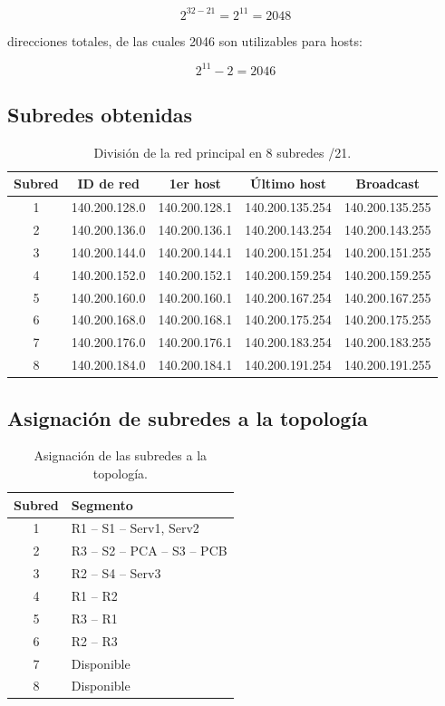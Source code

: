 \documentclass[12pt]{article}
\begin{document}
\[
2^{32-21}=2^{11}=2048
\]

direcciones totales, de las cuales 2046 son utilizables para hosts:

\[
2^{11}-2=2046
\]

\subsection{Subredes obtenidas}

\begin{table}[h]
\centering
\begin{tabular}{c|c|c|c|c}
\textbf{Subred} & \textbf{ID de red} & \textbf{1er host} &
\textbf{Último host} & \textbf{Broadcast}\\
\hline
1 & 140.200.128.0 & 140.200.128.1 & 140.200.135.254 & 140.200.135.255\\
2 & 140.200.136.0 & 140.200.136.1 & 140.200.143.254 & 140.200.143.255\\
3 & 140.200.144.0 & 140.200.144.1 & 140.200.151.254 & 140.200.151.255\\
4 & 140.200.152.0 & 140.200.152.1 & 140.200.159.254 & 140.200.159.255\\
5 & 140.200.160.0 & 140.200.160.1 & 140.200.167.254 & 140.200.167.255\\
6 & 140.200.168.0 & 140.200.168.1 & 140.200.175.254 & 140.200.175.255\\
7 & 140.200.176.0 & 140.200.176.1 & 140.200.183.254 & 140.200.183.255\\
8 & 140.200.184.0 & 140.200.184.1 & 140.200.191.254 & 140.200.191.255
\end{tabular}
\caption{División de la red principal en 8 subredes /21.}
\end{table}

\subsection{Asignación de subredes a la topología}

\begin{table}[h]
\centering
\begin{tabular}{c|l}
\textbf{Subred} & \textbf{Segmento}\\
\hline
1 & R1 -- S1 -- Serv1, Serv2\\
2 & R3 -- S2 -- PCA -- S3 -- PCB\\
3 & R2 -- S4 -- Serv3\\
4 & R1 -- R2\\
5 & R3 -- R1\\
6 & R2 -- R3\\
7 & Disponible\\
8 & Disponible
\end{tabular}
\caption{Asignación de las subredes a la topología.}
\end{table}
\end{document}
